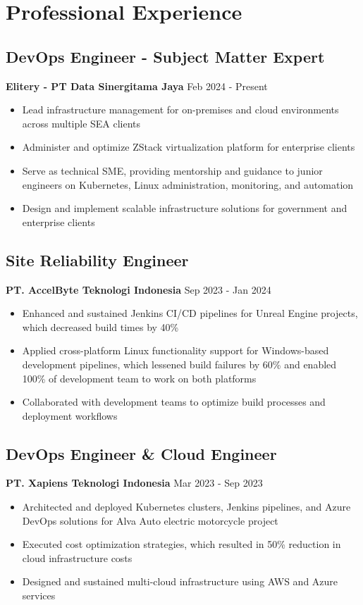 \documentclass[11pt,a4paper]{article}
\newcommand{\company}[1]{\textbf{\color{primary}#1}}
\newcommand{\daterange}[1]{\color{secondary}#1}  %
\begin{document}
\section{Professional Experience}

\subsection{DevOps Engineer - Subject Matter Expert}
\company{Elitery - PT Data Sinergitama Jaya} \hfill \daterange{Feb 2024 - Present}
\begin{itemize}[leftmargin=*, itemsep=2pt]
    \item Lead infrastructure management for on-premises and cloud environments across multiple SEA clients
    \item Administer and optimize ZStack virtualization platform for enterprise clients
    \item Serve as technical SME, providing mentorship and guidance to junior engineers on Kubernetes, Linux administration, monitoring, and automation
    \item Design and implement scalable infrastructure solutions for government and enterprise clients
\end{itemize}

\subsection{Site Reliability Engineer}
\company{PT. AccelByte Teknologi Indonesia} \hfill \daterange{Sep 2023 - Jan 2024}
\begin{itemize}[leftmargin=*, itemsep=2pt]
                \item Enhanced and sustained Jenkins CI/CD pipelines for Unreal Engine projects, which decreased build times by 40\%
        \item Applied cross-platform Linux functionality support for Windows-based development pipelines, which lessened build failures by 60\% and enabled 100\% of development team to work on both platforms
    \item Collaborated with development teams to optimize build processes and deployment workflows
\end{itemize}

\subsection{DevOps Engineer \& Cloud Engineer}
\company{PT. Xapiens Teknologi Indonesia} \hfill \daterange{Mar 2023 - Sep 2023}
\begin{itemize}[leftmargin=*, itemsep=2pt]
    \item Architected and deployed Kubernetes clusters, Jenkins pipelines, and Azure DevOps solutions for Alva Auto electric motorcycle project
        \item Executed cost optimization strategies, which resulted in 50\% reduction in cloud infrastructure costs
        \item Designed and sustained multi-cloud infrastructure using AWS and Azure services
\end{itemize}
\end{document}
